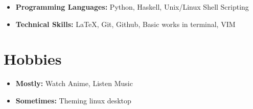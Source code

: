 \documentclass[11pt,a4paper,sans]{moderncv}        %
\begin{document}
	\begin{itemize}
		
		\item \textbf{Programming Languages:} Python, Haskell, Unix/Linux Shell Scripting
		
		\vspace{1pt}
		
		\item \textbf{Technical Skills:} \LaTeX, Git, Github, Basic works in terminal, VIM
		
		
	\end{itemize}
	\section{Hobbies}
	
	\vspace{1pt}
	
	\begin{itemize}
		
		\item \textbf{Mostly:} Watch Anime, Listen Music
		
		\vspace{1pt}
		
		\item \textbf{Sometimes:} Theming linux desktop
		
		
	\end{itemize}
	\nocite{*}
	
	
	
	
\end{document}
